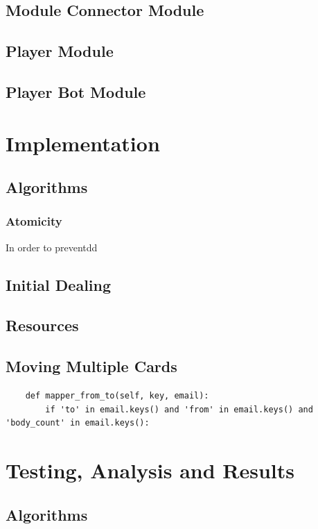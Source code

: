 \documentclass[runningheads,a4paper]{llncs}
\begin{document}
\subsection{Module Connector Module}

\subsection{Player Module}

\subsection{Player Bot Module}


\section{Implementation}
\label{sec:3_implementation}
\subsection{Algorithms}
\subsubsection{Atomicity}
In order to preventdd
\subsection{Initial Dealing}
\subsection{Resources}
\subsection{Moving Multiple Cards}

\begin{verbatim}
    def mapper_from_to(self, key, email):
        if 'to' in email.keys() and 'from' in email.keys() and 'body_count' in email.keys():
\end{verbatim}

\section{Testing, Analysis and Results}
\label{sec:3_implementation}
\subsection{Algorithms}
\end{document}
